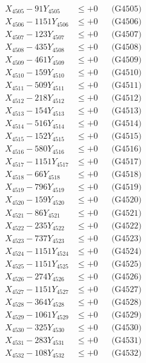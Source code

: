 \documentclass[a4paper,10pt]{article}
\begin{document}
{\begin{align}
X_{4505} - 91Y_{4505} &\leq +0 && \text{(G4505)} \\
X_{4506} - 1151Y_{4506} &\leq +0 && \text{(G4506)} \\
X_{4507} - 123Y_{4507} &\leq +0 && \text{(G4507)} \\
X_{4508} - 435Y_{4508} &\leq +0 && \text{(G4508)} \\
X_{4509} - 461Y_{4509} &\leq +0 && \text{(G4509)} \\
X_{4510} - 159Y_{4510} &\leq +0 && \text{(G4510)} \\
\allowbreak
X_{4511} - 509Y_{4511} &\leq +0 && \text{(G4511)} \\
X_{4512} - 218Y_{4512} &\leq +0 && \text{(G4512)} \\
X_{4513} - 154Y_{4513} &\leq +0 && \text{(G4513)} \\
X_{4514} - 516Y_{4514} &\leq +0 && \text{(G4514)} \\
X_{4515} - 152Y_{4515} &\leq +0 && \text{(G4515)} \\
X_{4516} - 580Y_{4516} &\leq +0 && \text{(G4516)} \\
X_{4517} - 1151Y_{4517} &\leq +0 && \text{(G4517)} \\
X_{4518} - 66Y_{4518} &\leq +0 && \text{(G4518)} \\
X_{4519} - 796Y_{4519} &\leq +0 && \text{(G4519)} \\
X_{4520} - 159Y_{4520} &\leq +0 && \text{(G4520)} \\
\allowbreak
X_{4521} - 86Y_{4521} &\leq +0 && \text{(G4521)} \\
X_{4522} - 235Y_{4522} &\leq +0 && \text{(G4522)} \\
X_{4523} - 737Y_{4523} &\leq +0 && \text{(G4523)} \\
X_{4524} - 1151Y_{4524} &\leq +0 && \text{(G4524)} \\
X_{4525} - 1151Y_{4525} &\leq +0 && \text{(G4525)} \\
X_{4526} - 274Y_{4526} &\leq +0 && \text{(G4526)} \\
X_{4527} - 1151Y_{4527} &\leq +0 && \text{(G4527)} \\
X_{4528} - 364Y_{4528} &\leq +0 && \text{(G4528)} \\
X_{4529} - 1061Y_{4529} &\leq +0 && \text{(G4529)} \\
X_{4530} - 325Y_{4530} &\leq +0 && \text{(G4530)} \\
\allowbreak
X_{4531} - 283Y_{4531} &\leq +0 && \text{(G4531)} \\
X_{4532} - 108Y_{4532} &\leq +0 && \text{(G4532)} \\

\end{align}}
\end{document}
